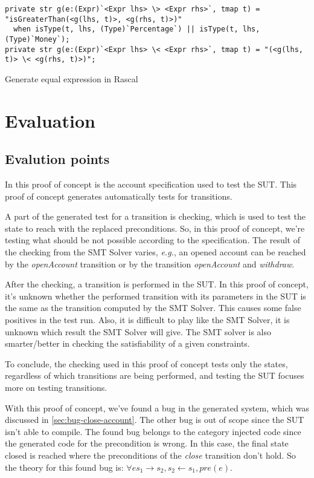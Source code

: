 \begin{sourcecode}[h!]
\begin{lstlisting}[]
private str g(e:(Expr)`<Expr lhs> \> <Expr rhs>`, tmap t) = "isGreaterThan(<g(lhs, t)>, <g(rhs, t)>)"
  when isType(t, lhs, (Type)`Percentage`) || isType(t, lhs, (Type)`Money`);
private str g(e:(Expr)`<Expr lhs> \< <Expr rhs>`, tmap t) = "(<g(lhs, t)> \< <g(rhs, t)>)";
\end{lstlisting}
\caption{Generate equal expression in Rascal}\label{fig:rascal-datomic-synthesize-lessthan}
\end{sourcecode}

\section{Evaluation}\label{sec:ch4-evaluation}

\subsection{Evalution points}
In this proof of concept is the account specification used to test the SUT.
This proof of concept generates automatically tests for transitions.

A part of
the generated test for a transition is checking, which is used to test the state to
reach with the replaced preconditions. So, in this proof of concept, we're
testing what should be not possible according to the specification. The result
of the checking from the SMT Solver varies, \textit{e.g.}, an opened account can be
reached by the \textit{openAccount} transition or by the transition
\textit{openAccount} and \textit{withdraw}.

After the checking, a transition
is performed in the SUT. In this proof of concept, it's unknown whether the
performed transition with its parameters in the SUT is the same as the
transition computed by the SMT Solver. This causes some false positives in the
test run. Also, it is difficult to play like the SMT Solver, it is unknown which
result the SMT Solver will give. The SMT solver is also smarter/better in checking
the satisfiability of a given constraints.

To conclude, the checking used in this proof of concept tests only the states, regardless of which transitions are
being performed, and testing the SUT focuses more on testing transitions.

With this proof of concept, we've found a bug in the generated system, which was
discussed in \autoref{sec:bug-close-account}. The other bug is out of scope
since the SUT isn't able to compile. The found bug belongs to the category
injected code since the generated code for the precondition is wrong. In this
case, the final state closed is reached where the preconditions of the \textit{close}
transition don't hold. So the theory for this found bug is:
$\forall e s_{1} \to s_{2}, s_{2} \gets s_{1}, pre(e)$.

